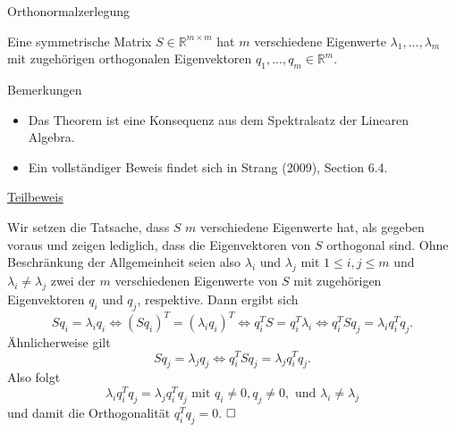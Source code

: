 \documentclass[
  8pt,
  ignorenonframetext,
]{beamer}
\providecommand{\tightlist}{%
  \setlength{\itemsep}{0pt}\setlength{\parskip}{0pt}}
\begin{document}
\begin{frame}{Orthonormalzerlegung}
\protect\hypertarget{orthonormalzerlegung}{}
\small
\begin{theorem}
\justifying
\normalfont
Eine symmetrische Matrix $S \in \mathbb{R}^{m \times m}$ hat $m$ verschiedene
Eigenwerte $\lambda_1,...,\lambda_m$ mit zugehörigen orthogonalen
Eigenvektoren $q_1,...,q_m \in \mathbb{R}^m$.
\end{theorem}
\vspace{-2mm}
\footnotesize

Bemerkungen \vspace{-1mm}

\begin{itemize}
\tightlist
\item
  Das Theorem ist eine Konsequenz aus dem Spektralsatz der Linearen
  Algebra.
\item
  Ein vollständiger Beweis findet sich in Strang (2009), Section 6.4.
\end{itemize}

\vspace{-2mm}

\underline{Teilbeweis}

Wir setzen die Tatsache, dass \(S\) \(m\) verschiedene Eigenwerte hat,
als gegeben voraus und zeigen lediglich, dass die Eigenvektoren von
\(S\) orthogonal sind. Ohne Beschränkung der Allgemeinheit seien also
\(\lambda_i\) und \(\lambda_j\) mit \(1 \le i,j \le m\) und
\(\lambda_i \neq \lambda_j\) zwei der \(m\) verschiedenen Eigenwerte von
\(S\) mit zugehörigen Eigenvektoren \(q_i\) und \(q_j\), respektive.
Dann ergibt sich \begin{equation}
Sq_i = \lambda_i q_i
\Leftrightarrow
(Sq_i)^T = (\lambda_i q_i)^T
\Leftrightarrow
q_i^T S = q_i^T \lambda_i
\Leftrightarrow
q_i^T Sq_j = \lambda_i q_i^Tq_j.
\end{equation} Ähnlicherweise gilt \begin{equation}
Sq_j = \lambda_j q_j
\Leftrightarrow
q_i^T Sq_j = \lambda_j q_i^Tq_j.
\end{equation} Also folgt \begin{equation}
\lambda_i q_i^Tq_j
=
\lambda_j q_i^Tq_j
\mbox{ mit } q_i \neq 0, q_j \neq 0, \mbox{ und } \lambda_i \neq \lambda_j
\end{equation} und damit die Orthogonalität \(q_i^Tq_j = 0\).
\(\hfill \Box\)
\end{frame}
\end{document}
